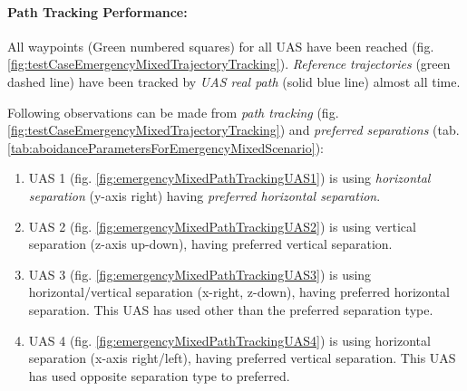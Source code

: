     \noindent\paragraph{Path Tracking Performance:} All waypoints (Green numbered squares) for all UAS have been reached (fig. \ref{fig:testCaseEmergencyMixedTrajectoryTracking}). \emph{Reference trajectories} (green dashed line) have been tracked by \emph{UAS real path} (solid blue line) almost all time. 
    
    Following observations can be made from \emph{path tracking} (fig. \ref{fig:testCaseEmergencyMixedTrajectoryTracking}) and \emph{preferred separations} (tab. \ref{tab:aboidanceParametersForEmergencyMixedScenario}):
    
    \begin{enumerate}
        \item UAS 1 (fig. \ref{fig:emergencyMixedPathTrackingUAS1}) is using \emph{horizontal separation} (y-axis right) having \emph{preferred horizontal separation}.
        
        \item UAS 2 (fig. \ref{fig:emergencyMixedPathTrackingUAS2}) is using vertical separation (z-axis up-down), having preferred vertical separation.
        
        \item UAS 3 (fig. \ref{fig:emergencyMixedPathTrackingUAS3}) is using horizontal/vertical separation (x-right, z-down), having preferred horizontal separation.  This UAS has used other than the  preferred separation type.
        
        \item UAS 4 (fig. \ref{fig:emergencyMixedPathTrackingUAS4}) is using horizontal separation (x-axis right/left), having preferred vertical separation. This UAS has used opposite separation type to preferred.
    \end{enumerate}
    
